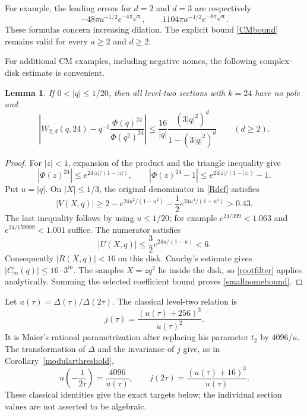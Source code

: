 \documentclass[11pt]{amsart}
\newtheorem{lemma}[theorem]{Lemma}
\theoremstyle{definition}
\theoremstyle{remark}
\numberwithin{equation}{section}
\begin{document}
For example, the leading errors for $d=2$ and $d=3$ are respectively
\[
 -48\pi a^{-1/2}e^{-4\pi\sqrt a},\qquad
 1104\pi a^{-1/2}e^{-8\pi\sqrt a}.
\]
These formulas concern increasing dilation. The explicit bound
\eqref{CMbound} remains valid for every $a\ge2$ and $d\ge2$.

For additional CM examples, including negative nomes, the following complex-disk estimate is convenient.

\begin{lemma}\label{smallnome}
If $0<|q|\le1/20$, then all level-two sections with $k=24$ have no pole and
\begin{equation}\label{smallnomebound}
 \left|W_{2,d}(q,24)-q^{-1}\frac{\Phi(q)^{24}}{\Phi(q^2)^{24}}\right|
 \le\frac{16}{|q|}\frac{(3|q|^2)^d}{1-(3|q|^2)^d}
 \qquad(d\ge2).
\end{equation}
\end{lemma}
\begin{proof}
For $|z|<1$, expansion of the product and the triangle inequality give
\begin{equation}\label{complexproductbound}
 |\Phi(z)^{24}|\le e^{24|z|/(1-|z|)},\qquad
 |\Phi(z)^{24}-1|\le e^{24|z|/(1-|z|)}-1.
\end{equation}
Put $u=|q|$. On $|X|\le1/3$, the original denominator in \eqref{Rdef} satisfies
\[
 |V(X,q)|\ge2-e^{24u^2/(1-u^2)}
              -\frac12e^{24u^4/(1-u^4)}>0.43.
\]
The last inequality follows by using $u\le1/20$; for example
$e^{24/399}<1.063$ and $e^{24/159999}<1.001$ suffice. The numerator satisfies
\[
 |U(X,q)|\le\frac32e^{24u/(1-u)}<6.
\]
Consequently $|R(X,q)|<16$ on this disk. Cauchy's estimate gives $|C_m(q)|\le16\cdot3^m$. The samples $X=zq^2$ lie inside the disk, so \eqref{rootfilter} applies analytically. Summing the selected coefficient bound proves \eqref{smallnomebound}.
\end{proof}

Let $u(\tau)=\Delta(\tau)/\Delta(2\tau)$. The classical level-two relation is
\begin{equation}\label{jrelation}
 j(\tau)=\frac{(u(\tau)+256)^3}{u(\tau)^2}.
\end{equation}
It is Maier's rational parametrization \cite[eq.~(1.6)]{Maier} after replacing his parameter $t_2$ by $4096/u$. The transformation of $\Delta$ and the invariance of $j$ give, as in Corollary~\ref{modularthreshold},
\begin{equation}\label{CMdoubling}
 u\!\left(-\frac1{2\tau}\right)=\frac{4096}{u(\tau)},
 \qquad j(2\tau)=\frac{(u(\tau)+16)^3}{u(\tau)}.
\end{equation}
These classical identities give the exact targets below; the individual section values are not asserted to be algebraic.
\end{document}
